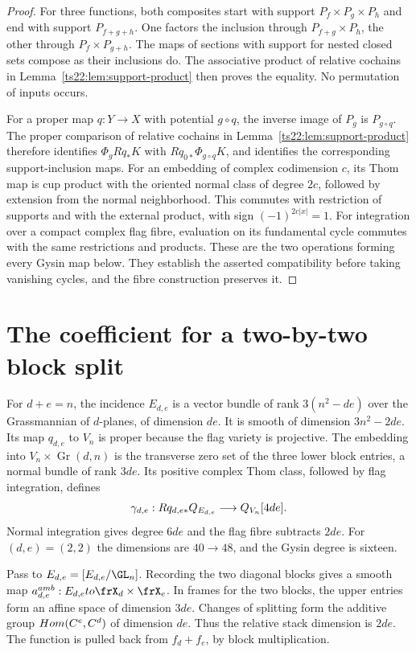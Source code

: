 \begin{proof}
For three functions, both composites start with support
$P_f\times P_g\times P_h$ and end with support $P_{f+g+h}$.
One factors the inclusion through $P_{f+g}\times P_h$, the other
through $P_f\times P_{g+h}$. The maps of sections with support for
nested closed sets compose as their inclusions do. The associative
product of relative cochains in Lemma~\ref{ts22:lem:support-product}
then proves the equality. No permutation of inputs occurs.

For a proper map $q:Y\to X$ with potential $g\circ q$, the inverse
image of $P_g$ is $P_{g\circ q}$. The proper comparison of relative
cochains in Lemma~\ref{ts22:lem:support-product} therefore identifies
$\Phi_gRq_*K$ with $Rq_{0*}\Phi_{g\circ q}K$, and identifies the
corresponding support-inclusion maps. For an embedding of complex
codimension $c$, its Thom map is cup product with the oriented
normal class of degree $2c$, followed by extension from the normal
neighborhood. This commutes with restriction of supports and with
the external product, with sign $(-1)^{2c|x|}=1$.
For integration over a compact complex flag fibre, evaluation on
its fundamental cycle commutes with the same restrictions and
products. These are the two operations forming every Gysin map
below. They establish the asserted compatibility before taking
vanishing cycles, and the fibre construction preserves it.
\end{proof}

\section{The coefficient for a two-by-two block split}
\label{ts22:sec:product}

For $d+e=n$, the incidence $E_{d,e}$ is a vector bundle of rank
$3(n^2-de)$ over the Grassmannian of $d$-planes, of dimension $de$.
It is smooth of dimension $3n^2-2de$. Its map $q_{d,e}$ to $V_n$
is proper because the flag variety is projective. The embedding
into $V_n\times\operatorname{Gr}(d,n)$ is the transverse zero set
of the three lower block entries, a normal bundle of rank $3de$.
Its positive complex Thom class, followed by flag integration,
defines
\[
 \gamma_{d,e}:Rq_{d,e*}Q_{E_{d,e}}\longrightarrow Q_{V_n}[4de].
\]
Normal integration gives degree $6de$ and the flag fibre subtracts
$2de$. For $(d,e)=(2,2)$ the dimensions are $40\to48$, and the
Gysin degree is sixteen.

Pass to $\cE_{d,e}=[E_{d,e}/\GL_n]$. Recording the two diagonal
blocks gives a smooth map
$a^{\mathrm{amb}}_{d,e}:\cE_{d,e}\to\frX_d\times\frX_e$.
In frames for the two blocks, the upper entries form an affine
space of dimension $3de$. Changes of splitting form the additive
group $Hom(C^e,C^d)$ of dimension $de$.
Thus the relative stack dimension is $2de$. The function is pulled
back from $f_d+f_e$, by block multiplication.

